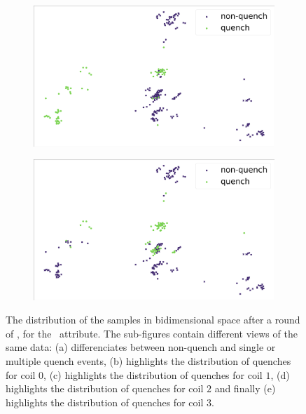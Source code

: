 \begin{figure}[!ht]
\begin{subfigure}{0.49\linewidth}
		\subcaption{}
	\end{subfigure}
	\begin{subfigure}{0.49\linewidth}
		\includegraphics[width=\linewidth]{img/quench_dist_qlp/quenches_coil_2_An.png}
		\subcaption{}
	\end{subfigure}
	\begin{subfigure}{0.49\linewidth}
		\includegraphics[width=\linewidth]{img/quench_dist_qlp/quenches_coil_3_An.png}
		\subcaption{}
	\end{subfigure}
	\caption{The distribution of the samples in bidimensional space after a round of \pca, for
		the \an\ attribute. The sub-figures contain different views of the same data: (a) differenciates between non-quench and single or multiple quench events, (b) highlights the distribution of quenches for coil $0$, (c) highlights the distribution of quenches for coil $1$, (d) highlights the distribution of quenches for coil $2$ and finally (e) highlights the distribution of quenches for coil $3$.}
	\label{fig:an-coilq-dist}
\end{figure}

